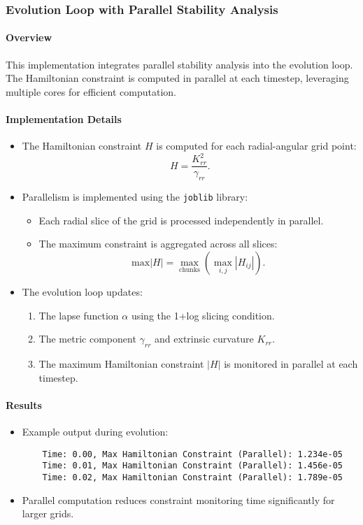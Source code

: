\documentclass[12pt]{article}
\begin{document}
\subsubsection{Evolution Loop with Parallel Stability Analysis}

\paragraph{Overview}
This implementation integrates parallel stability analysis into the evolution loop. The Hamiltonian constraint is computed in parallel at each timestep, leveraging multiple cores for efficient computation.

\paragraph{Implementation Details}
\begin{itemize}
    \item The Hamiltonian constraint $H$ is computed for each radial-angular grid point:
    \[
    H = \frac{K_{rr}^2}{\gamma_{rr}}.
    \]
    \item Parallelism is implemented using the \texttt{joblib} library:
    \begin{itemize}
        \item Each radial slice of the grid is processed independently in parallel.
        \item The maximum constraint is aggregated across all slices:
        \[
        \text{max}|H| = \max_{\text{chunks}} \left(\max_{i,j} \left| H_{ij} \right| \right).
        \]
    \end{itemize}
    \item The evolution loop updates:
    \begin{enumerate}
        \item The lapse function $\alpha$ using the 1+log slicing condition.
        \item The metric component $\gamma_{rr}$ and extrinsic curvature $K_{rr}$.
        \item The maximum Hamiltonian constraint $|H|$ is monitored in parallel at each timestep.
    \end{enumerate}
\end{itemize}

\paragraph{Results}
\begin{itemize}
    \item Example output during evolution:
    \begin{verbatim}
    Time: 0.00, Max Hamiltonian Constraint (Parallel): 1.234e-05
    Time: 0.01, Max Hamiltonian Constraint (Parallel): 1.456e-05
    Time: 0.02, Max Hamiltonian Constraint (Parallel): 1.789e-05
    \end{verbatim}
    \item Parallel computation reduces constraint monitoring time significantly for larger grids.
\end{itemize}
\end{document}
